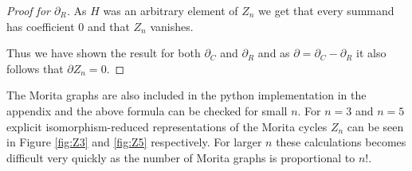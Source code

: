 \begin{proof}[Proof for $\partial_{R}$]
	As $H$ was an arbitrary element of $Z_{n}$ we get that every summand has coefficient $0$ and that $Z_{n}$ vanishes.


	Thus we have shown the result for both $\partial_{C}$ and $\partial_{R}$ and as $\partial = \partial_{C} - \partial_{R}$ it also follows that $\partial Z_{n} = 0$.
\end{proof}

\begin{remark}
	The Morita graphs are also included in the python implementation in the appendix and the above formula can be checked for small $n$.
	For $n=3$ and $n=5$ explicit isomorphism-reduced representations of the Morita cycles $Z_{n}$ can be seen in Figure \ref{fig:Z3} and \ref{fig:Z5} respectively.
	For larger $n$ these calculations becomes difficult very quickly as the number of Morita graphs is proportional to $n!$.
\end{remark}

